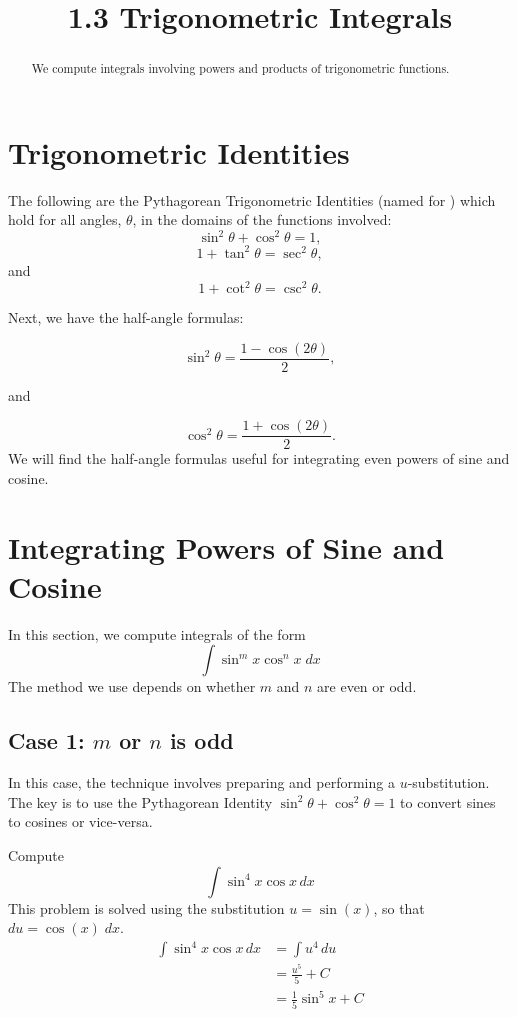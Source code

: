 \documentclass[handout]{ximera}
\title{1.3 Trigonometric Integrals}
\begin{document}
\begin{abstract}
We compute integrals involving powers and products of trigonometric functions.
\end{abstract}

\maketitle

\section{Trigonometric Identities}

The following are the Pythagorean Trigonometric Identities 
(named for ) which hold for all angles,
$\theta$, in the domains of the functions involved:
\[
\sin^2\theta + \cos^2\theta = 1,
\]
\[
1 + \tan^2\theta = \sec^2\theta,
\]
and
\[
1 + \cot^2\theta = \csc^2\theta.
\]


Next, we have the half-angle formulas:

\[
\sin^2\theta = \frac{1-\cos(2\theta)}{2},
\]

and

\[
\cos^2\theta = \frac{1+\cos(2\theta)}{2}.
\]
We will find the half-angle formulas useful for integrating even powers of sine and cosine.

\section{Integrating Powers of Sine and Cosine}

In this section, we compute integrals of the form
\[
\int \sin^m x \cos^n x \; dx
\]
The method we use depends on whether $m$ and $n$ are even or odd.

\subsection{Case 1: $m$ or $n$ is odd}
In this case, the technique involves preparing and performing a $u$-substitution. The key is to use the Pythagorean 
Identity $\sin^2 \theta + \cos^2 \theta = 1$ to convert
sines to cosines or vice-versa.

\begin{example}[example 1]
Compute
\[
\int \sin^4 x \cos x \, dx
\]
This problem is solved using the substitution $u = \sin(x)$, so that $du = \cos(x) \; dx$.
\begin{align*}
\int \sin^4 x \cos x \, dx &= \int u^4 \, du\\
                             &= \frac{u^5}{5} + C\\
                             &= \frac15 \sin^5 x + C
\end{align*}

\end{example}
\end{document}
